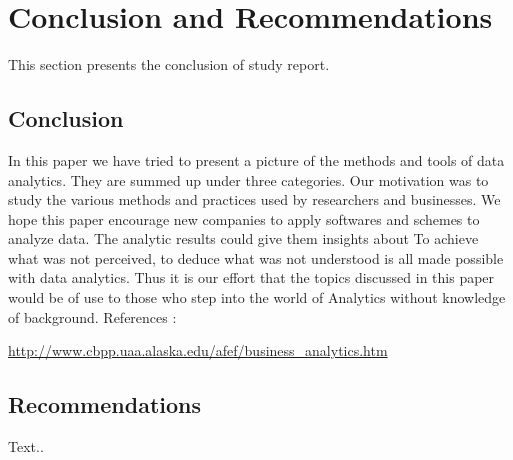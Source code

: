 \setlength{\footskip}{8mm}

\chapter{Conclusion and Recommendations}
\label{ch:conclusion}

This section presents the conclusion of study report.

\section{Conclusion}

In this paper we have tried to present a picture of the methods and tools of data analytics. They are summed up under three categories. Our motivation was to study the various methods and practices used by researchers and businesses.
We hope this paper encourage new companies to apply softwares and schemes to analyze data. The analytic results could give them insights about
To achieve what was not perceived, to deduce what was not understood is all made possible with data analytics. Thus it is our effort that the topics discussed in this paper would be of use to those who step into the world of Analytics without knowledge of background.
References :

\url{ http://www.cbpp.uaa.alaska.edu/afef/business_analytics.htm}

\section{Recommendations}

Text..

\FloatBarrier

